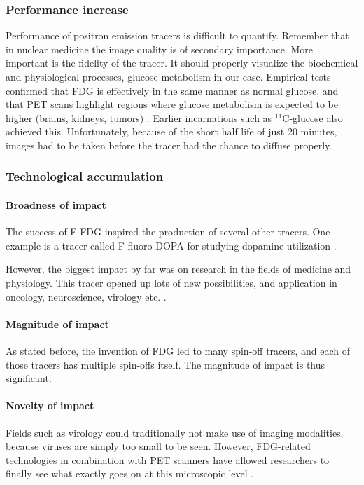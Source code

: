 \subsubsection{Performance increase}
Performance of positron emission tracers is difficult to quantify. Remember that
in nuclear medicine the image quality is of secondary importance. More important
is the fidelity of the tracer. It should properly visualize the biochemical and
physiological processes, glucose metabolism in our case. Empirical tests
confirmed that FDG is effectively in the same manner as normal glucose, and that
PET scans highlight regions where glucose metabolism is expected to be higher
(brains, kidneys, tumors) \cite{radiopharma}. Earlier incarnations such as
$^{11}$C-glucose also achieved this. Unfortunately, because of the short half
life of just 20 minutes, images had to be taken before the tracer had the chance
to diffuse properly. 

\subsubsection{Technological accumulation}
\paragraph{Broadness of impact}
The success of F-FDG inspired the production of several other tracers. One
example is a tracer called F-fluoro-DOPA for studying dopamine utilization
\cite{radiopharma}.

However, the biggest impact by far was on research in the fields of medicine and
physiology. This tracer opened up lots of new possibilities, and application in
oncology, neuroscience, virology etc. \cite{fdgresearch1, fdgresearch2}.

\paragraph{Magnitude of impact}
As stated before, the invention of FDG led to many spin-off tracers, and each of
those tracers has multiple spin-offs itself. The magnitude of impact is thus
significant.

\paragraph{Novelty of impact}
Fields such as virology could traditionally not make use of imaging modalities,
because viruses are simply too small to be seen. However, FDG-related
technologies in combination with PET scanners have allowed researchers to
finally see what exactly goes on at this microscopic level \cite{fdgresearch2}.

